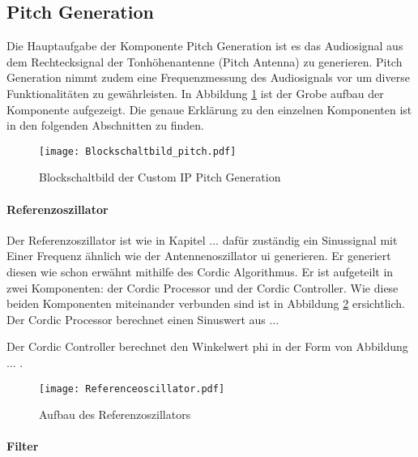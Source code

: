 \subsection{Pitch Generation}\label{subsec:Pitch_Generation}

Die Hauptaufgabe der Komponente Pitch Generation ist es das Audiosignal aus dem Rechtecksignal der Tonhöhenantenne (Pitch Antenna) zu generieren. Pitch Generation nimmt zudem eine Frequenzmessung des Audiosignals vor um diverse Funktionalitäten zu gewährleisten. In Abbildung \ref{img:Blockschaltbild_pitch} ist der Grobe aufbau der Komponente aufgezeigt. Die genaue Erklärung zu den einzelnen Komponenten ist in den folgenden Abschnitten zu finden.


\begin{figure}[h!]
	\centering
	\texttt{[image: Blockschaltbild\_pitch.pdf]}
	\caption{Blockschaltbild der Custom IP Pitch Generation} 
	\label{img:Blockschaltbild_pitch}
\end{figure}  



\paragraph{Referenzoszillator}

Der Referenzoszillator ist wie in Kapitel ...  dafür zuständig ein Sinussignal mit Einer Frequenz ähnlich wie der Antennenoszillator ui generieren. Er generiert diesen wie schon erwähnt mithilfe des Cordic Algorithmus. Er ist aufgeteilt in zwei Komponenten: der Cordic Processor und der Cordic Controller. Wie diese beiden Komponenten miteinander verbunden sind ist in Abbildung \ref{img:Referenceoscillator} ersichtlich. \\

Der Cordic Processor berechnet einen Sinuswert aus ...

Der Cordic Controller berechnet den Winkelwert phi in der Form von Abbildung ... . 

\begin{figure}[h!]
	\centering
	\texttt{[image: Referenceoscillator.pdf]}
	\caption{Aufbau des Referenzoszillators} 
	\label{img:Referenceoscillator}
\end{figure}  


\paragraph{Filter}

